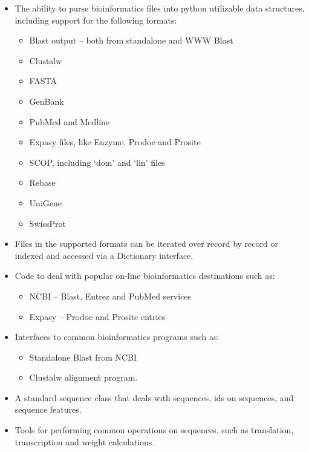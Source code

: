 \documentclass{report}
\begin{document}
\begin{itemize}
  \item The ability to parse bioinformatics files into python utilizable data structures, including support for the following formats:

  \begin{itemize}
    \item Blast output -- both from standalone and WWW Blast
    \item Clustalw
    \item FASTA
    \item GenBank
    \item PubMed and Medline
    \item Expasy files, like Enzyme, Prodoc and Prosite
    \item SCOP, including `dom' and `lin' files
    \item Rebase
    \item UniGene
    \item SwissProt
  \end{itemize}

  \item Files in the supported formats can be iterated over record by record or indexed and accessed via a Dictionary interface.

  \item Code to deal with popular on-line bioinformatics destinations such as:

  \begin{itemize}
    \item NCBI -- Blast, Entrez and PubMed services
    \item Expasy -- Prodoc and Prosite entries
  \end{itemize}

  \item Interfaces to common bioinformatics programs such as:

  \begin{itemize}
    \item Standalone Blast from NCBI
    \item Clustalw alignment program.
  \end{itemize}

  \item A standard sequence class that deals with sequences, ids on sequences, and sequence features.

  \item Tools for performing common operations on sequences, such as translation, transcription and weight calculations.


\end{itemize}
\end{document}
